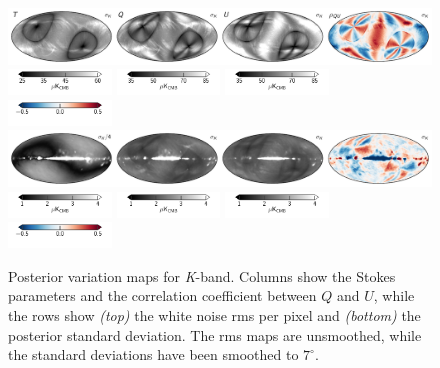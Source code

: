 \documentclass[twocolumn]{../../common/aa}
\newcommand{\K}[0]{\textit K}
\begin{document}
\begin{figure}[t]
	\centering
	\includegraphics[width=\textwidth]{figures/023-WMAP_K_rms.pdf}\\
	\includegraphics[width=0.245\textwidth]{figures/cbar_rms_I.pdf}
	\includegraphics[width=0.245\textwidth]{figures/cbar_rms_P.pdf}
	\includegraphics[width=0.245\textwidth]{figures/cbar_rms_P.pdf}
	\includegraphics[width=0.245\textwidth]{figures/cbar_rho.pdf}\\
	\includegraphics[width=\textwidth]{figures/023-WMAP_K_std.pdf}\\
	\includegraphics[width=0.245\textwidth]{figures/cbar_std.pdf}
	\includegraphics[width=0.245\textwidth]{figures/cbar_std.pdf}
	\includegraphics[width=0.245\textwidth]{figures/cbar_std.pdf}
	\includegraphics[width=0.245\textwidth]{figures/cbar_rho.pdf}\\
	\caption{Posterior variation maps for \K-band. Columns show the Stokes parameters and the correlation coefficient between $Q$ and $U$, while the rows show \textit{(top)} the white noise rms per pixel and \textit{(bottom)} the posterior standard deviation. The rms maps are unsmoothed, while the standard deviations have been smoothed to $7^\circ$.}
        \label{fig:K_rms_std}


\end{figure}
\end{document}
